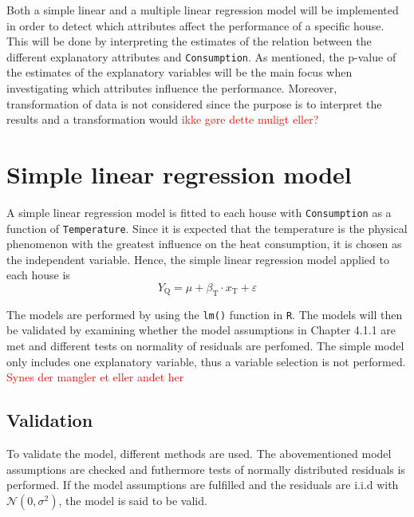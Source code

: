 \noindent Both a simple linear and a multiple linear regression model will be implemented in order to detect which attributes affect the performance of a specific house. This will be done by interpreting the estimates of the relation between the different explanatory attributes and \texttt{Consumption}. As mentioned, the p-value of the estimates of the explanatory variables will be the main focus when investigating which attributes influence the performance. Moreover, transformation of data is not considered since the purpose is to interpret the results and a transformation would \textcolor{red}{ikke gøre dette muligt eller?}

\section{Simple linear regression model}
A simple linear regression model is fitted to each house with \texttt{Consumption} as a function of \texttt{Temperature}. Since it is expected that the temperature is the physical phenomenon with the greatest influence on the heat consumption, it is chosen as the independent variable. Hence, the simple linear regression model applied to each house is
\begin{equation}
    Y_{\text{Q}} = \mu + \beta_{\text{T}} \cdot x_{\text{T}} + \varepsilon
    \label{eq: simple}
\end{equation}

\noindent The models are performed by using the \texttt{lm()} function in \texttt{R}. The models will then be validated by examining whether the model assumptions in Chapter 4.1.1 are met and different tests on normality of residuals are perfomed. The simple model only includes one explanatory variable, thus a variable selection is not performed. \textcolor{red}{Synes der mangler et eller andet her}

\subsection{Validation}
To validate the model, different methods are used. The abovementioned model assumptions are checked and futhermore tests of normally distributed residuals is performed. If the model assumptions are fulfilled and the residuals are i.i.d with $\mathcal{N}(0,\sigma^2)$, the model is said to be valid. \\

